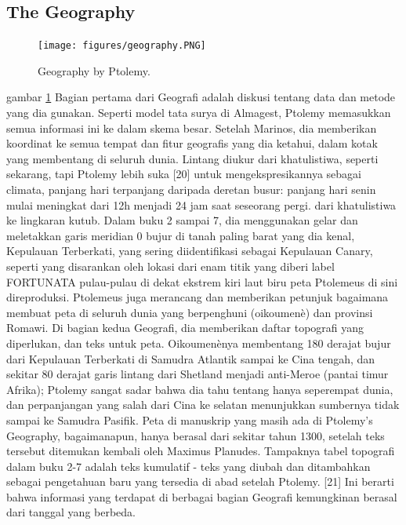   \subsection{The Geography}	
   \begin{figure} [ht]
	\centerline{\texttt{[image: figures/geography.PNG]}}
	\caption{Geography by Ptolemy.}
	\label{geography}
		\end{figure}
    gambar \ref {geography} Bagian pertama dari Geografi adalah diskusi tentang data dan metode yang dia gunakan. Seperti model tata surya di Almagest, Ptolemy memasukkan semua informasi ini ke dalam skema besar. Setelah Marinos, dia memberikan koordinat ke semua tempat dan fitur geografis yang dia ketahui, dalam kotak yang membentang di seluruh dunia. Lintang diukur dari khatulistiwa, seperti sekarang, tapi Ptolemy lebih suka [20] untuk mengekspresikannya sebagai climata, panjang hari terpanjang daripada deretan busur: panjang hari senin mulai meningkat dari 12h menjadi 24 jam saat seseorang pergi. dari khatulistiwa ke lingkaran kutub. Dalam buku 2 sampai 7, dia menggunakan gelar dan meletakkan garis meridian 0 bujur di tanah paling barat yang dia kenal, Kepulauan Terberkati, yang sering diidentifikasi sebagai Kepulauan Canary, seperti yang disarankan oleh lokasi dari enam titik yang diberi label FORTUNATA pulau-pulau di dekat ekstrem kiri laut biru peta Ptolemeus di sini direproduksi.
	Ptolemeus juga merancang dan memberikan petunjuk bagaimana membuat peta di seluruh dunia yang berpenghuni (oikoumenè) dan provinsi Romawi. Di bagian kedua Geografi, dia memberikan daftar topografi yang diperlukan, dan teks untuk peta. Oikoumenènya membentang 180 derajat bujur dari Kepulauan Terberkati di Samudra Atlantik sampai ke Cina tengah, dan sekitar 80 derajat garis lintang dari Shetland menjadi anti-Meroe (pantai timur Afrika); Ptolemy sangat sadar bahwa dia tahu tentang hanya seperempat dunia, dan perpanjangan yang salah dari Cina ke selatan menunjukkan sumbernya tidak sampai ke Samudra Pasifik.
	Peta di manuskrip yang masih ada di Ptolemy's Geography, bagaimanapun, hanya berasal dari sekitar tahun 1300, setelah teks tersebut ditemukan kembali oleh Maximus Planudes. Tampaknya tabel topografi dalam buku 2-7 adalah teks kumulatif - teks yang diubah dan ditambahkan sebagai pengetahuan baru yang tersedia di abad setelah Ptolemy. [21] Ini berarti bahwa informasi yang terdapat di berbagai bagian Geografi kemungkinan berasal dari tanggal yang berbeda. 

